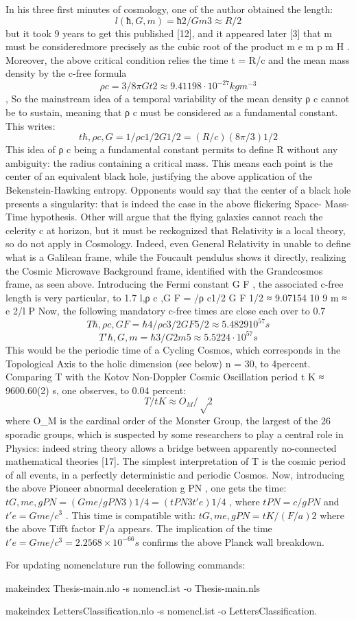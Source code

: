In his three first minutes of cosmology, one of the author obtained the length:
$$l (ħ,G,m) = ħ 2 /Gm 3 ≈ R/2$$
but it took 9 years to get this published [12], and it appeared later [3] that m must be consideredmore precisely as the cubic root of the product m e m p m H . Moreover, the above critical condition
relies the time t = R/c and the mean mass density by the c-free formula $$ρ c = 3/8\pi Gt2 ≈ 9.41198 \cdot
10^{-27} kg m^{-3}$$ , So the mainstream idea of a temporal variability of the mean density ρ c cannot be to
sustain, meaning that ρ c must be considered as a fundamental constant. This writes:
$$t{\hbar,ρ c ,G} = 1/ρ c1/2 G 1/2 = (R/c) (8\pi/3) 1/2$$
This idea of ρ c being a fundamental constant permits to define R without any ambiguity: the
radius containing a critical mass. This means each point is the center of an equivalent black hole,
justifying the above application of the Bekenstein-Hawking entropy. Opponents would say that the
center of a black hole presents a singularity: that is indeed the case in the above flickering Space-
Mass-Time hypothesis. Other will argue that the flying galaxies cannot reach the celerity c at
horizon, but it must be reckognized that Relativity is a local theory, so do not apply in Cosmology.
Indeed, even General Relativity in unable to define what is a Galilean frame, while the Foucault
pendulus shows it directly, realizing the Cosmic Microwave Background frame, identified with the
Grandcosmos frame, as seen above.
Introducing the Fermi constant G F , the associated c-free length is very particular, to 1.7 %
l{\hbar,ρ c ,G F } = \hbar/ρ c1/2 G F 1/2 ≈ 9.07154 10 9 m ≈ \lambdabar e 2/l P
Now, the following mandatory c-free times are close each over to 0.7 %
$$T{\hbar,ρ c ,G F } = \hbar 4 /ρ c3/2 G F 5/2 ≈ 5.4829 10^{57} s$$
$$T'{\hbar,G,m} = \hbar 3 /G 2 m 5 ≈ 5.5224 \cdot 10^{57} s$$
This would be the periodic time of a Cycling Cosmos, which corresponds in the Topological Axis to
the holic dimension (see below) n = 30, to 4{percent}. Comparing T with the Kotov Non-Doppler Cosmic
Oscillation period t K ≈ 9600.60(2) s, one observes, to 0.04 {percent}:
$$T/t K ≈ O_M /√2$$
where O_M is the cardinal order of the Monster Group, the largest of the 26 sporadic groups, which is
suspected by some researchers to play a central role in Physics: indeed string theory allows a bridge
between apparently no-connected mathematical theories [17]. The simplest interpretation of T is the
cosmic period of all events, in a perfectly deterministic and periodic Cosmos.
Now, introducing the above Pioneer abnormal deceleration g PN , one gets the time: $t{G, m e , g PN }
= (Gm e /g PN 3 ) 1/4 = (t PN 3 t' e ) 1/4$ , where $t PN = c/g PN$ and $t' e = Gm e /c^3$ . This time is compatible with:
$t{G, m e , g PN } = t K /(F/a) 2$
where the above Tifft factor F/a appears. The implication of the time $t' e = Gm e /c^3 = 2.2568 × 10^{-66} s$
confirms the above Planck wall breakdown.

For updating nomenclature run the following commands:

makeindex Thesis-main.nlo -s nomencl.ist -o Thesis-main.nls

makeindex LettersClassification.nlo -s nomencl.ist -o LettersClassification.
